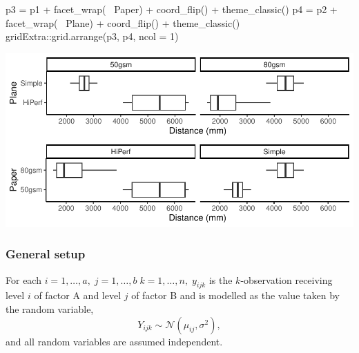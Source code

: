 \documentclass[a4paper]{article}
\begin{document}
\begin{Schunk}
{}

\begin{Sinput}
p3 = p1 + facet_wrap(~ Paper) + coord_flip() + theme_classic()
p4 = p2 + facet_wrap(~ Plane) + coord_flip() + theme_classic()
gridExtra::grid.arrange(p3, p4, ncol = 1)
\end{Sinput}


{\centering \includegraphics[width=\maxwidth]{figure/listings-unnamed-chunk-305-2} 

}

\end{Schunk}
\subsubsection{General setup}
For each \( i = 1,\dotsc,a,\;j = 1,\dotsc,b\;k=1,\dotsc,n,\; y_{ijk} \) is the \( k \)-observation receiving level \( i \) of factor A and level \( j \) of factor B and is modelled as the value taken by the random variable,
\[
	Y_{ijk}\sim \mathcal{N}(\mu_{ij},\sigma^2),
\]
and all random variables are assumed independent.
\end{document}
